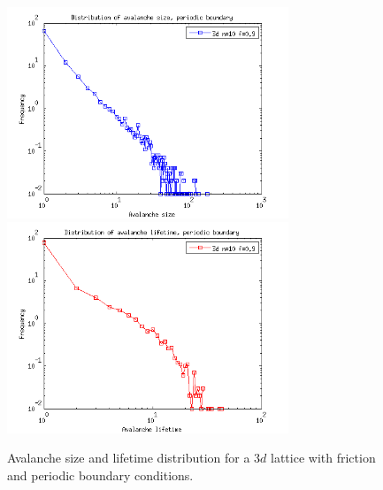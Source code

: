 \begin{figure}
\begin{center}
\includegraphics[width=0.75\textwidth]{results/3spf.png} \\
\includegraphics[width=0.75\textwidth]{results/3tpf.png} \\
\caption{Avalanche size and lifetime distribution for a $3d$ lattice with friction and periodic boundary conditions. }
\label{dspf3}
\end{center}
\end{figure}

